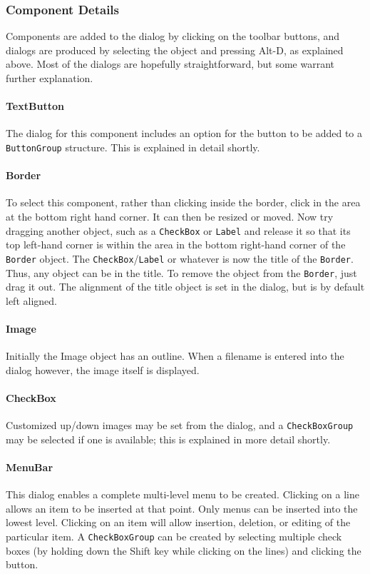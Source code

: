 \subsubsection[Component Details]{Component Details}
Components are added to the dialog by clicking on the toolbar buttons,
and dialogs are produced by selecting the object and pressing Alt-D, as
explained above. Most of the dialogs are hopefully straightforward, but
some warrant further explanation.

\paragraph{TextButton}
The dialog for this component includes an option for the button to be
added to a \texttt{ButtonGroup} structure. This is explained in detail
shortly.

\paragraph{Border}
To select this component, rather than
clicking inside the border, click in the area at the bottom right hand
corner. It can then be resized or moved. Now try dragging another
object, such as a \texttt{CheckBox} or \texttt{Label} and release it so
that its top left-hand corner is within the area in the bottom
right-hand corner of the \texttt{Border} object. The
\texttt{CheckBox}/\texttt{Label} or whatever is now the title of the
\texttt{Border}. Thus, any object can be in the title. To remove the
object from the \texttt{Border}, just drag it out. The alignment of the
title object is set in the dialog, but is by default left aligned.

\paragraph{Image}
Initially the Image object has an outline. When a filename is entered
into the dialog however, the image itself is displayed.

\paragraph{CheckBox}
Customized up/down images may be set from the dialog, and a
\texttt{CheckBoxGroup} may be selected if one is available; this is
explained in more detail shortly.

\paragraph{MenuBar}
This dialog enables a complete multi-level menu to be
created. Clicking on a line allows an item to be inserted at that
point. Only menus can be inserted into the lowest level.
Clicking on an item will allow insertion, deletion, or editing of the
particular item. A \texttt{CheckBoxGroup} can be created by selecting
multiple check boxes (by holding down the Shift key while clicking on
the lines) and clicking the button.

